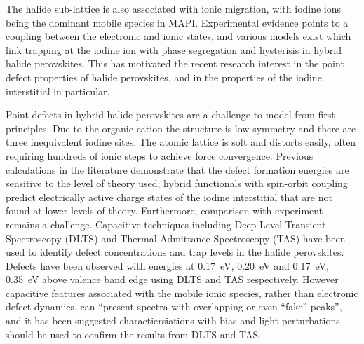 The halide sub-lattice is also associated with ionic migration, with iodine ions being the dominant mobile species in MAPI. %
Experimental evidence points to a coupling between the electronic and ionic states, and various models exist which link trapping at the iodine ion with phase segregation and hysterisis in hybrid halide perovskites.
This has motivated the recent research interest in the point defect properties of halide perovskites, and in the properties of the iodine interstitial in particular.

Point defects in hybrid halide perovskites are a challenge to model from first principles. Due to the organic cation the structure is low symmetry and there are three inequivalent iodine sites. The atomic lattice is soft and distorts easily, often requiring hundreds of ionic steps to achieve force convergence. 
Previous calculations in the literature demonstrate that the defect formation energies are sensitive to the level of theory used; hybrid functionals with spin-orbit coupling predict electrically active charge states of the iodine interstitial that are not found at lower levels of theory.
Furthermore, comparison with experiment remains a challenge. Capacitive techniques including Deep Level Transient Spectroscopy (DLTS) and Thermal Admittance Spectroscopy (TAS) have been used to identify defect concentrations and trap levels in the halide perovskites.
Defects have been observed with energies at \SI{0.17}{\electronvolt}, \SI{0.20}{\electronvolt} and \SI{0.17}{\electronvolt}, \SI{0.35}{\electronvolt} above valence band edge using DLTS and TAS respectively.
However capacitive features associated with the mobile ionic species, rather than electronic defect dynamics, can ``present spectra with overlapping or even ``fake'' peaks'', and it has been suggested charactiersiations with bias and light perturbations should be used to confirm the results from DLTS and TAS.


